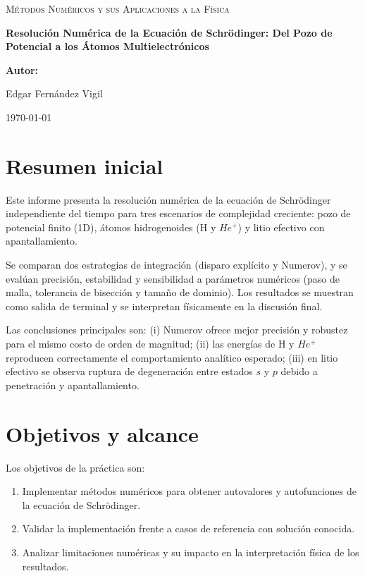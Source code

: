 \documentclass[11pt]{article}
\begin{document}
\begin{titlepage}
    \centering
    \vspace*{2cm}
    {\scshape\Large Métodos Numéricos y sus Aplicaciones a la Física \par}
    \vspace{1.5cm}
    {\huge\bfseries Resolución Numérica de la Ecuación de Schrödinger: Del Pozo de Potencial a los Átomos Multielectrónicos \par}
    \vspace{2cm}
    {\Large\textbf{Autor:}\par}
    {\Large  Edgar Fernández Vigil\par}
    \vfill
    {\large \today \par}
\end{titlepage}

\newpage
\tableofcontents
\newpage

\section*{Resumen inicial}
Este informe presenta la resolución numérica de la ecuación de Schrödinger independiente del tiempo para tres escenarios de complejidad creciente: pozo de potencial finito (1D), átomos hidrogenoides (H y $He^+$) y litio efectivo con apantallamiento.

Se comparan dos estrategias de integración (disparo explícito y Numerov), y se evalúan precisión, estabilidad y sensibilidad a parámetros numéricos (paso de malla, tolerancia de bisección y tamaño de dominio). Los resultados se muestran como salida de terminal y se interpretan físicamente en la discusión final.

Las conclusiones principales son: (i) Numerov ofrece mejor precisión y robustez para el mismo costo de orden de magnitud; (ii) las energías de H y $He^+$ reproducen correctamente el comportamiento analítico esperado; (iii) en litio efectivo se observa ruptura de degeneración entre estados $s$ y $p$ debido a penetración y apantallamiento.

\section{Objetivos y alcance}
Los objetivos de la práctica son:
\begin{enumerate}
    \item Implementar métodos numéricos para obtener autovalores y autofunciones de la ecuación de Schrödinger.
    \item Validar la implementación frente a casos de referencia con solución conocida.
    \item Analizar limitaciones numéricas y su impacto en la interpretación física de los resultados.
\end{enumerate}
\end{document}
